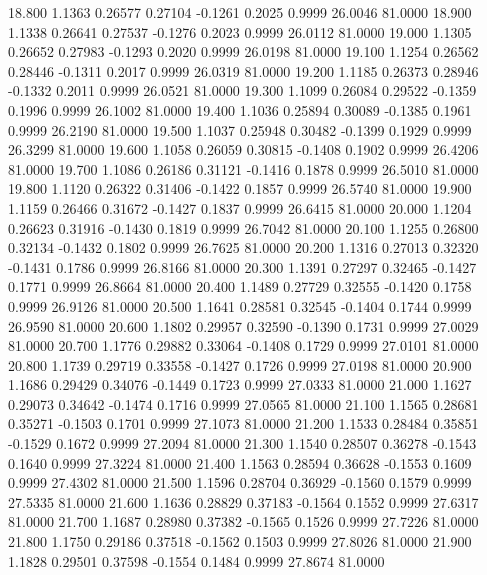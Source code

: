   18.800   1.1363   0.26577   0.27104  -0.1261   0.2025   0.9999  26.0046  81.0000
  18.900   1.1338   0.26641   0.27537  -0.1276   0.2023   0.9999  26.0112  81.0000
  19.000   1.1305   0.26652   0.27983  -0.1293   0.2020   0.9999  26.0198  81.0000
  19.100   1.1254   0.26562   0.28446  -0.1311   0.2017   0.9999  26.0319  81.0000
  19.200   1.1185   0.26373   0.28946  -0.1332   0.2011   0.9999  26.0521  81.0000
  19.300   1.1099   0.26084   0.29522  -0.1359   0.1996   0.9999  26.1002  81.0000
  19.400   1.1036   0.25894   0.30089  -0.1385   0.1961   0.9999  26.2190  81.0000
  19.500   1.1037   0.25948   0.30482  -0.1399   0.1929   0.9999  26.3299  81.0000
  19.600   1.1058   0.26059   0.30815  -0.1408   0.1902   0.9999  26.4206  81.0000
  19.700   1.1086   0.26186   0.31121  -0.1416   0.1878   0.9999  26.5010  81.0000
  19.800   1.1120   0.26322   0.31406  -0.1422   0.1857   0.9999  26.5740  81.0000
  19.900   1.1159   0.26466   0.31672  -0.1427   0.1837   0.9999  26.6415  81.0000
  20.000   1.1204   0.26623   0.31916  -0.1430   0.1819   0.9999  26.7042  81.0000
  20.100   1.1255   0.26800   0.32134  -0.1432   0.1802   0.9999  26.7625  81.0000
  20.200   1.1316   0.27013   0.32320  -0.1431   0.1786   0.9999  26.8166  81.0000
  20.300   1.1391   0.27297   0.32465  -0.1427   0.1771   0.9999  26.8664  81.0000
  20.400   1.1489   0.27729   0.32555  -0.1420   0.1758   0.9999  26.9126  81.0000
  20.500   1.1641   0.28581   0.32545  -0.1404   0.1744   0.9999  26.9590  81.0000
  20.600   1.1802   0.29957   0.32590  -0.1390   0.1731   0.9999  27.0029  81.0000
  20.700   1.1776   0.29882   0.33064  -0.1408   0.1729   0.9999  27.0101  81.0000
  20.800   1.1739   0.29719   0.33558  -0.1427   0.1726   0.9999  27.0198  81.0000
  20.900   1.1686   0.29429   0.34076  -0.1449   0.1723   0.9999  27.0333  81.0000
  21.000   1.1627   0.29073   0.34642  -0.1474   0.1716   0.9999  27.0565  81.0000
  21.100   1.1565   0.28681   0.35271  -0.1503   0.1701   0.9999  27.1073  81.0000
  21.200   1.1533   0.28484   0.35851  -0.1529   0.1672   0.9999  27.2094  81.0000
  21.300   1.1540   0.28507   0.36278  -0.1543   0.1640   0.9999  27.3224  81.0000
  21.400   1.1563   0.28594   0.36628  -0.1553   0.1609   0.9999  27.4302  81.0000
  21.500   1.1596   0.28704   0.36929  -0.1560   0.1579   0.9999  27.5335  81.0000
  21.600   1.1636   0.28829   0.37183  -0.1564   0.1552   0.9999  27.6317  81.0000
  21.700   1.1687   0.28980   0.37382  -0.1565   0.1526   0.9999  27.7226  81.0000
  21.800   1.1750   0.29186   0.37518  -0.1562   0.1503   0.9999  27.8026  81.0000
  21.900   1.1828   0.29501   0.37598  -0.1554   0.1484   0.9999  27.8674  81.0000
